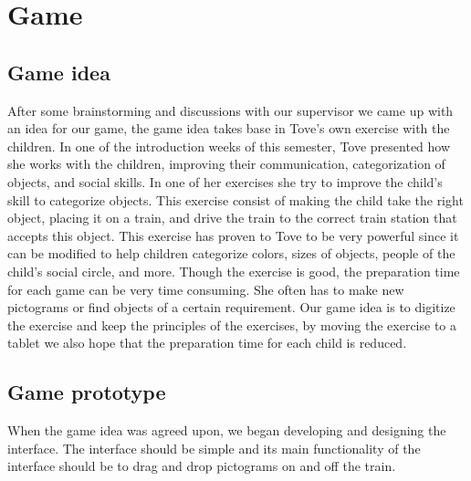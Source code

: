 \section{Game}
\subsection*{Game idea}
After some brainstorming and discussions with our supervisor we came up with an idea for our game, the game idea takes base in Tove's own exercise with the children. In one of the introduction weeks of this semester, Tove presented how she works with the children, improving their communication, categorization of objects, and social skills. In one of her exercises she try to improve the child's skill to categorize objects. This exercise consist of making the child take the right object, placing it on a train, and drive the train to the correct train station that accepts this object. This exercise has proven to Tove to be very powerful since it can be modified to help children categorize colors, sizes of objects, people of the child's social circle, and more. Though the exercise is good, the preparation time for each game can be very time consuming. She often has to make new pictograms or find objects of a certain requirement. Our game idea is to digitize the exercise and keep the principles of the exercises, by moving the exercise to a tablet we also hope that the preparation time for each child is reduced.
\subsection*{Game prototype}
When the game idea was agreed upon, we began developing and designing the interface. The interface should be simple and its main functionality of the interface should be to drag and drop pictograms on and off the train. 
  